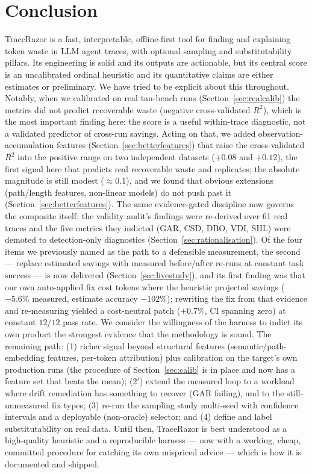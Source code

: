 \documentclass[11pt]{article}
\begin{document}
\section{Conclusion}
TraceRazor is a fast, interpretable, offline-first tool for finding and
explaining token waste in LLM agent traces, with optional sampling and
substitutability pillars. Its engineering is solid and its outputs are
actionable, but its central score is an uncalibrated ordinal heuristic and its
quantitative claims are either estimates or preliminary. We have tried to be
explicit about this throughout. Notably, when we calibrated on real tau-bench
runs (Section~\ref{sec:realcalib}) the metrics did not predict recoverable waste
(negative cross-validated $R^2$), which is the most important finding here: the
score is a useful within-trace diagnostic, not a validated predictor of cross-run
savings. Acting on that, we added observation-accumulation features
(Section~\ref{sec:betterfeatures}) that raise the cross-validated $R^2$ into the
positive range on two independent datasets ($+0.08$ and $+0.12$), the first
signal here that predicts real recoverable waste and replicates; the absolute
magnitude is still modest ($\approx 0.1$), and we found that obvious extensions
(path/length features, non-linear models) do not push past it
(Section~\ref{sec:betterfeatures}). The same evidence-gated discipline now
governs the composite itself: the validity audit's findings were re-derived
over 61 real traces and the five metrics they indicted (GAR, CSD, DBO, VDI,
SHL) were demoted to detection-only diagnostics
(Section~\ref{sec:rationalisation}). Of the four items we previously named as the path to a defensible
measurement, the second --- replace estimated savings with measured
before/after re-runs at constant task success --- is now delivered
(Section~\ref{sec:livestudy}), and its first finding was that our own
auto-applied fix cost tokens where the heuristic projected savings
($-5.6\%$ measured, estimate accuracy $-102\%$); rewriting the fix from
that evidence and re-measuring yielded a cost-neutral patch
($+0.7\%$, CI spanning zero) at constant $12/12$ pass rate. We consider the
willingness of the harness to indict its own product the strongest evidence
that the methodology is sound. The remaining path: (1) richer signal beyond
structural features (semantic/path-embedding features, per-token attribution)
plus calibration on the target's own production runs (the procedure of
Section~\ref{sec:calib} is in place and now has a feature set that beats the
mean); (2$'$) extend the measured loop to a workload where drift remediation
has something to recover (GAR failing), and to the still-unmeasured fix
types; (3) re-run the sampling study multi-seed with confidence intervals and
a deployable (non-oracle) selector; and (4) define and label substitutability
on real data. Until then, TraceRazor is best understood as a high-quality
heuristic and a reproducible harness --- now with a working, cheap, committed
procedure for catching its own mispriced advice --- which is how it is
documented and shipped.
\end{document}
